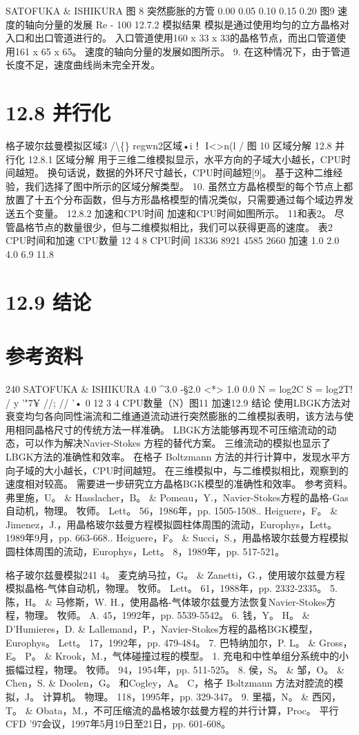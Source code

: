 \documentclass[UTF8,11pt,a4paper,openany,fontset=fandol]{ctexbook}
\begin{document}
SATOFUKA \& ISHIKURA 图 8 突然膨胀的方管 0.00 0.05 0.10 0.15 0.20 图9 速度的轴向分量的发展 Re - 100 12.7.2 模拟结果 模拟是通过使用均匀的立方晶格对入口和出口管道进行的。 入口管道使用160 x 33 x 33的晶格节点，而出口管道使用161 x 65 x 65。 速度的轴向分量的发展如图所示。 9. 在这种情况下，由于管道长度不足，速度曲线尚未完全开发。

\section{12.8 并行化}
格子玻尔兹曼模拟区域3 /\textbackslash\{\} regwn2区域•i！ I<>n(l / 图 10 区域分解 12.8 并行化 12.8.1 区域分解 用于三维二维模拟显示，水平方向的子域大小越长，CPU时间越短。 换句话说，数据的外环尺寸越长，CPU时间越短[9]。 基于这种二维经验，我们选择了图中所示的区域分解类型。 10. 虽然立方晶格模型的每个节点上都放置了十五个分布函数，但与方形晶格模型的情况类似，只需要通过每个域边界发送五个变量。 12.8.2 加速和CPU时间 加速和CPU时间如图所示。 11和表2。 尽管晶格节点的数量很少，但与二维模拟相比，我们可以获得更高的速度。 表2 CPU时间和加速 CPU数量 12 4 8 CPU时间 18336 8921 4585 2660 加速 1.0 2.0 4.0 6.9 11.8

\section{12.9 结论}
\section{参考资料}
240 SATOFUKA \& ISHIKURA 4.0 \textasciicircum{}3.0 -§2.0 <*> 1.0 0.0 N = log2C S = log2T! / y '"7¥ //; // '• 0 12 3 4 CPU数量（N）图11 加速12.9 结论 使用LBGK方法对衰变均匀各向同性湍流和二维通道流动进行突然膨胀的二维模拟表明，该方法与使用相同晶格尺寸的传统方法一样准确。 LBGK方法能够再现不可压缩流动的动态，可以作为解决Navier-Stokes 方程的替代方案。 三维流动的模拟也显示了LBGK方法的准确性和效率。 在格子 Boltzmann 方法的并行计算中，发现水平方向子域的大小越长，CPU时间越短。 在三维模拟中，与二维模拟相比，观察到的速度相对较高。 需要进一步研究立方晶格BGK模型的准确性和效率。 参考资料。 弗里施，U。 \& Hasslacher，B。 \& Pomeau，Y.，Navier-Stokes方程的晶格-Gas自动机，物理。 牧师。 Lett。 56，1986年，pp. 1505-1508.. Heiguere，F。 \& Jimenez，J.，用晶格玻尔兹曼方程模拟圆柱体周围的流动，Europhys，Lett。 1989年9月，pp. 663-668.. Heiguere，F。 \& Succi，S.，用晶格玻尔兹曼方程模拟圆柱体周围的流动，Europhys，Lett。 8，1989年，pp. 517-521。

格子玻尔兹曼模拟241 4。 麦克纳马拉，G。 \& Zanetti，G.，使用玻尔兹曼方程模拟晶格-气体自动机，物理。 牧师。 Lett。 61，1988年，pp. 2332-2335。 5. 陈，H。 \& 马修斯，W. H.，使用晶格-气体玻尔兹曼方法恢复Navier-Stokes方程，物理。 牧师。 A. 45，1992年，pp. 5539-5542。 6. 钱，Y。 H。 \& D'Humieres，D. \& Lallemand，P.，Navier-Stokes方程的晶格BGK模型，Europhys。 Lett。 17，1992年，pp. 479-484。 7. 巴特纳加尔，P. L。 \& Gross，E。 P。 \& Krook，M.，气体碰撞过程的模型。 1. 充电和中性单组分系统中的小振幅过程，物理。 牧师。 94，1954年，pp. 511-525。 8. 侯，S。 \& 邹，O。 \& Chen，S. \& Doolen，G。 和Cogley，A。 C，格子 Boltzmann 方法对腔流的模拟，J。 计算机。 物理。 118，1995年，pp. 329-347。 9. 里福，N。 \& 西冈，T。 \& Obata，M.，不可压缩流的晶格玻尔兹曼方程的并行计算，Proc。 平行CFD '97会议，1997年5月19日至21日，pp. 601-608。
\end{document}
